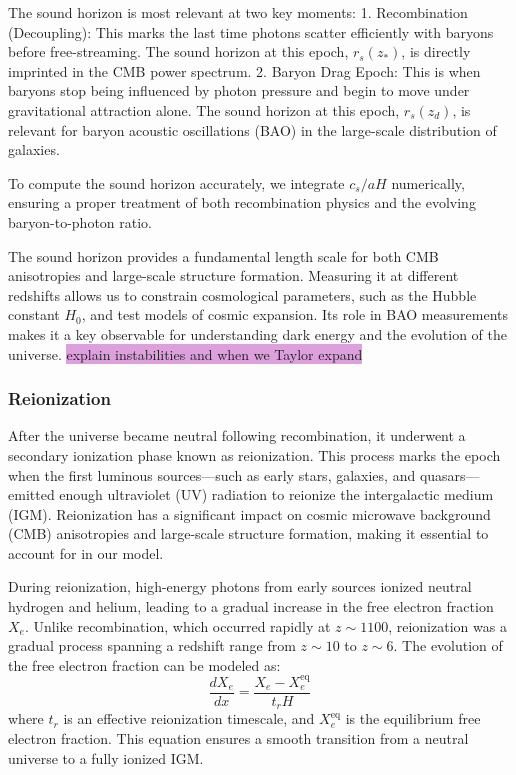 \documentclass{aa}
\begin{document}
The sound horizon is most relevant at two key moments:
1. Recombination (Decoupling): This marks the last time photons scatter efficiently with baryons before free-streaming. The sound horizon at this epoch, $r_s(z_*)$, is directly imprinted in the CMB power spectrum.
2. Baryon Drag Epoch: This is when baryons stop being influenced by photon pressure and begin to move under gravitational attraction alone. The sound horizon at this epoch, $r_s(z_d)$, is relevant for baryon acoustic oscillations (BAO) in the large-scale distribution of galaxies.

To compute the sound horizon accurately, we integrate $c_s / aH$ numerically, ensuring a proper treatment of both recombination physics and the evolving baryon-to-photon ratio.

The sound horizon provides a fundamental length scale for both CMB anisotropies and large-scale structure formation. Measuring it at different redshifts allows us to constrain cosmological parameters, such as the Hubble constant $H_0$, and test models of cosmic expansion. Its role in BAO measurements makes it a key observable for understanding dark energy and the evolution of the universe.
\color{black}
\colorbox{Plum}{explain instabilities and when we Taylor expand}







\subsubsection{Reionization}
\color{Plum}
After the universe became neutral following recombination, it underwent a secondary ionization phase known as reionization. This process marks the epoch when the first luminous sources—such as early stars, galaxies, and quasars—emitted enough ultraviolet (UV) radiation to reionize the intergalactic medium (IGM). Reionization has a significant impact on cosmic microwave background (CMB) anisotropies and large-scale structure formation, making it essential to account for in our model.

During reionization, high-energy photons from early sources ionized neutral hydrogen and helium, leading to a gradual increase in the free electron fraction $X_e$. Unlike recombination, which occurred rapidly at $z \sim 1100$, reionization was a gradual process spanning a redshift range from $z \sim 10$ to $z \sim 6$. The evolution of the free electron fraction can be modeled as:
\begin{equation}
\frac{dX_e}{dx} = \frac{X_e - X_e^\text{eq}}{t_r H}
\end{equation}
where $t_r$ is an effective reionization timescale, and $X_e^\text{eq}$ is the equilibrium free electron fraction. This equation ensures a smooth transition from a neutral universe to a fully ionized IGM.
\end{document}
